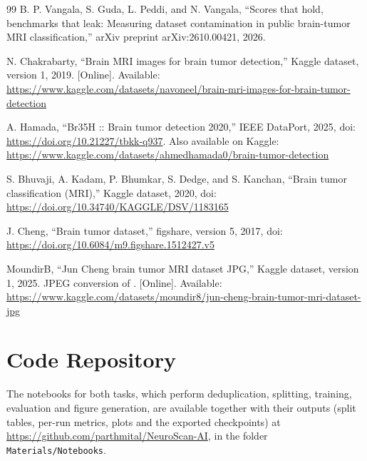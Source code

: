 \documentclass[final,3p,times,number]{elsarticle}
\begin{document}
\begin{thebibliography}{99}
 B. P. Vangala, S. Guda, L. Peddi, and N. Vangala, ``Scores that hold, benchmarks that leak: Measuring dataset contamination in public brain-tumor MRI classification,'' arXiv preprint arXiv:2610.00421, 2026.

 N. Chakrabarty, ``Brain MRI images for brain tumor detection,'' Kaggle dataset, version 1, 2019. [Online]. Available: \url{https://www.kaggle.com/datasets/navoneel/brain-mri-images-for-brain-tumor-detection}

 A. Hamada, ``Br35H :: Brain tumor detection 2020,'' IEEE DataPort, 2025, doi: \url{https://doi.org/10.21227/tbkk-q937}. Also available on Kaggle: \url{https://www.kaggle.com/datasets/ahmedhamada0/brain-tumor-detection}

 S. Bhuvaji, A. Kadam, P. Bhumkar, S. Dedge, and S. Kanchan, ``Brain tumor classification (MRI),'' Kaggle dataset, 2020, doi: \url{https://doi.org/10.34740/KAGGLE/DSV/1183165}

 J. Cheng, ``Brain tumor dataset,'' figshare, version 5, 2017, doi: \url{https://doi.org/10.6084/m9.figshare.1512427.v5}

 MoundirB, ``Jun Cheng brain tumor MRI dataset JPG,'' Kaggle dataset, version 1, 2025. JPEG conversion of \cite{ds4}. [Online]. Available: \url{https://www.kaggle.com/datasets/moundir8/jun-cheng-brain-tumor-mri-dataset-jpg}

\end{thebibliography}

\FloatBarrier
\appendix

\section{Code Repository}
\label{app:code}

The notebooks for both tasks, which perform deduplication, splitting, training, evaluation and figure generation, are available together with their outputs (split tables, per-run metrics, plots and the exported checkpoints) at \url{https://github.com/parthmital/NeuroScan-AI}, in the folder \texttt{Materials/Notebooks}.
\end{document}

